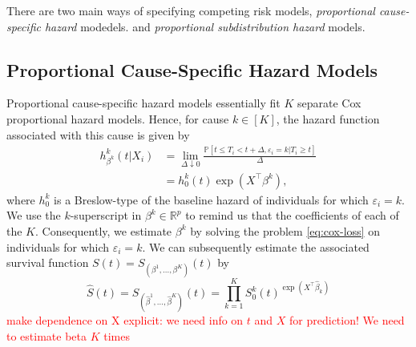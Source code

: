 \documentclass[11pt]{article}
\renewcommand{\P}{\mathbb{P}}
\newcommand{\R}{\mathbb{R}}
\begin{document}
There are two main ways of specifying competing risk models, \textit{proportional cause-specific hazard} modedels. and \textit{proportional subdistribution hazard} models.

\subsection{Proportional Cause-Specific Hazard Models}
Proportional cause-specific hazard models essentially fit $K$ separate Cox proportional hazard models. Hence, for cause $k\in[K]$, the hazard function associated with this cause is given by
\begin{equation*}
\begin{split}
     h^k_{\beta^k}(t|X_i) &= \lim_{\Delta \downarrow 0}\frac{\P[t \leq T_i < t + \Delta, \varepsilon_i = k | T_i \geq t]}{\Delta} 
     \\ &=
     h_0^k (t) \exp (X^\top \beta^k),
\end{split}
\end{equation*}
where $h_0^k$ is a Breslow-type of the baseline hazard of individuals for which $\varepsilon_i = k$. We use the $k$-superscript in $\beta^k \in \R^p$ to remind us that the coefficients of each of the $K$. Consequently, we estimate $\beta^k$ by solving the problem \eqref{eq:cox-loss} on individuals for which $\varepsilon_i = k$. We can subsequently estimate the associated survival function $S(t) = S_{(\beta^1,\dots,\beta^K)}(t)$ by
\[
    \hat{S}(t) = S_{(\hat{\beta}^1,\dots,\hat{\beta}^K)}(t)
    =
    \prod_{k=1}^K
    S_0^k(t)^{\exp(X^\top\widehat{\beta}_k)}
\]
\textcolor{red}{make dependence on X explicit: we need info on $t$ and $X$ for prediction! We need to estimate beta $K$ times}


\end{document}
